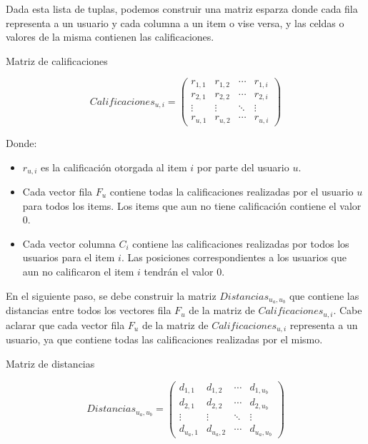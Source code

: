 \documentclass[11pt,a4paper,twoside]{thesis}
\begin{document}
Dada esta lista de tuplas, podemos construir una matriz esparza donde cada fila representa a un usuario y cada columna a un item o vise versa, y las celdas o valores de la misma contienen las calificaciones.


\begin{description}
	\item[Matriz de calificaciones]
\end{description}
\begin{equation}
	Calificaciones_{u,i} =
	\begin{pmatrix}
	r_{1,1} & r_{1,2} & \cdots & r_{1,i} \\
	r_{2,1} & r_{2,2} & \cdots & r_{2,i} \\
	\vdots  & \vdots  & \ddots & \vdots  \\
	r_{u,1} & r_{u,2} & \cdots & r_{u,i}
	\end{pmatrix}
\end{equation}

\begin{description}
	\item[Donde:]
\end{description}
\begin{itemize}
	\item $r_{u,i}$ es la calificación otorgada al item $i$ por parte del usuario $u$.
	\item Cada vector fila $F_u$ contiene todas la calificaciones realizadas por el usuario $u$ para todos los items. Los items que aun no tiene calificación contiene el valor $0$.
	\item Cada vector columna $C_i$ contiene las calificaciones realizadas por todos los usuarios para el item $i$. Las posiciones correspondientes a los usuarios que aun no calificaron el item $i$ tendrán el valor $0$. 
\end{itemize}


En el siguiente paso, se debe construir la matriz $Distancias_{u_a,u_b}$ que contiene las distancias entre todos los vectores fila $F_u$ de la matriz de $Calificaciones_{u,i}$.
Cabe aclarar que cada vector fila $F_u$ de la matriz de $Calificaciones_{u,i}$ representa a un usuario, ya que contiene todas las calificaciones realizadas por el mismo.


\clearpage
\begin{description}
	\item[Matriz de distancias]
\end{description}
\begin{equation}
	Distancias_{u_a,u_b} =
	\begin{pmatrix}
	d_{1,1} & d_{1,2} & \cdots & d_{1,u_b} \\
	d_{2,1} & d_{2,2} & \cdots & d_{2,u_b} \\
	\vdots  & \vdots  & \ddots & \vdots  \\
	d_{u_a,1} & d_{u_a,2} & \cdots & d_{u_a,u_b} 
	\end{pmatrix}
\end{equation}
\end{document}
